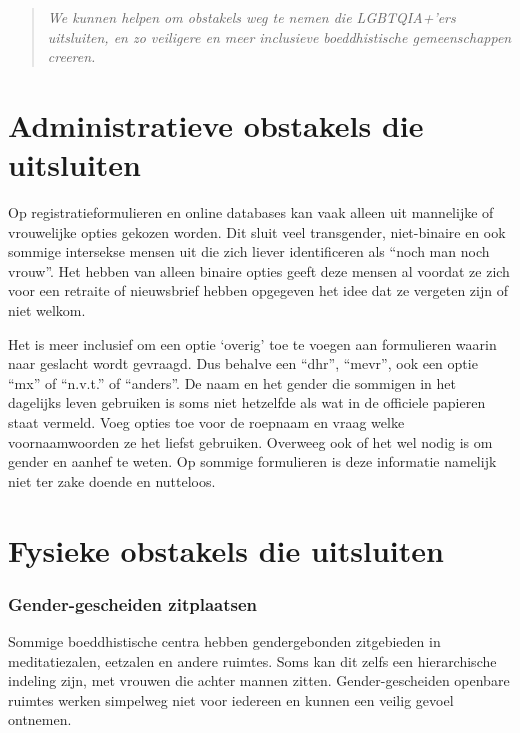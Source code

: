\documentclass[12pt,openany]{book}
\begin{document}
\begin{quote}
\textit{We kunnen helpen om obstakels weg te nemen die \mbox{LGBTQIA+’ers} uitsluiten, en zo veiligere en meer inclusieve boeddhistische gemeenschappen creeren.}
\end{quote}

\section*{Administratieve obstakels die uitsluiten}

Op registratieformulieren en online databases kan vaak alleen uit mannelijke of vrouwelijke opties gekozen worden.  Dit sluit veel transgender, niet-binaire en ook sommige intersekse mensen uit die zich liever identificeren als “noch man noch vrouw”. Het hebben van alleen binaire opties geeft deze mensen al voordat ze zich voor een retraite of nieuwsbrief hebben opgegeven het idee dat ze vergeten zijn of niet welkom.

Het is meer inclusief om een optie ‘overig’ toe te voegen aan formulieren waarin naar geslacht wordt gevraagd. Dus behalve een “dhr”, “mevr”, ook een optie “mx” of “n.v.t.” of “anders”. De naam en het gender die sommigen in het dagelijks leven gebruiken is soms niet hetzelfde als wat in de officiele papieren staat vermeld. Voeg opties toe voor de roepnaam en vraag welke voornaamwoorden ze het liefst gebruiken. Overweeg ook of het wel nodig is om gender en aanhef te weten. Op sommige formulieren is deze informatie namelijk niet ter zake doende en nutteloos.

\section*{Fysieke obstakels die uitsluiten}

\subsubsection*{Gender-gescheiden zitplaatsen}

Sommige boeddhistische centra hebben gendergebonden zitgebieden in meditatiezalen, eetzalen en andere ruimtes. Soms kan dit zelfs een hierarchische indeling zijn, met vrouwen die achter mannen zitten. Gender-gescheiden openbare ruimtes werken simpelweg niet voor iedereen en kunnen een veilig gevoel ontnemen. 
\end{document}
